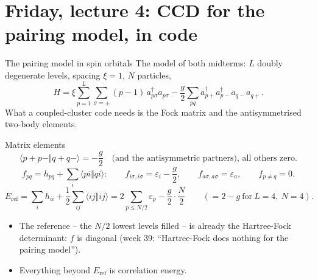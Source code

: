 \documentclass[aspectratio=169,10pt]{beamer}
\newcommand{\cre}[1]{a_{#1}^{\dagger}}
\newcommand{\ann}[1]{a_{#1}}
\newcommand{\Eref}{E_{\mathrm{ref}}}
\newcommand{\as}[4]{\langle #1#2\Vert #3#4\rangle}
\begin{document}
\section[Friday 4: CCD in code]{Friday, lecture 4: CCD for the pairing model, in code}

\begin{frame}[shrink=13]{The pairing model in spin orbitals}
\small
The model of both midterms: $L$ doubly degenerate levels, spacing $\xi=1$, $N$ particles,
\[
 H=\xi\sum_{p=1}^{L}\sum_{\sigma=\pm}(p-1)\,\cre{p\sigma}\ann{p\sigma}
 -\frac g2\sum_{pq}\cre{p+}\cre{p-}\ann{q-}\ann{q+}.
\]
What a coupled-cluster code needs is the Fock matrix and the antisymmetrised two-body elements.
\begin{block}{Matrix elements}
\[
 \as{p{+}}{p{-}}{q{+}}{q{-}}=-\frac g2\quad\text{(and the antisymmetric partners), all others zero.}
\]
\[
 f_{pq}=h_{pq}+\sum_{i}\as piqi:\qquad
 f_{i\sigma,i\sigma}=\varepsilon_i-\frac g2,\qquad f_{a\sigma,a\sigma}=\varepsilon_a,\qquad f_{p\ne q}=0 .
\]
\[
 \Eref=\sum_i h_{ii}+\frac12\sum_{ij}\as ijij=2\sum_{p\le N/2}\varepsilon_p-\frac g2\cdot\frac N2
 \qquad(=2-g\ \text{for}\ L=4,\ N=4).
\]
\end{block}
\begin{itemize}
\item The reference -- the $N/2$ lowest levels filled -- is already the Hartree-Fock determinant: $f$ is diagonal (week 39: ``Hartree-Fock does nothing for the pairing model'').
\item Everything beyond $\Eref$ is correlation energy.
\end{itemize}
\end{frame}
\end{document}
